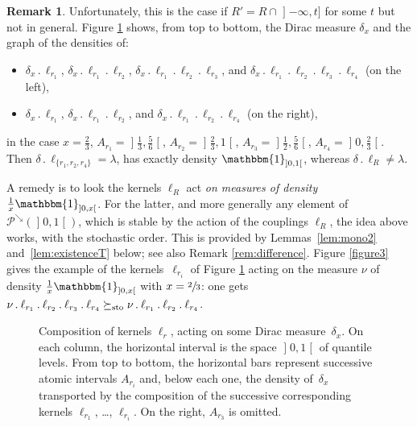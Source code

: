 \documentclass[JEP,XML,SOM,Unicode,NoEqCountersInSection,NoFloatCountersInSection,published]{cedram}
\newcommand{\ldot}{\mathbin{.}}
\theoremstyle{plain}
\theoremstyle{definition}
\newtheorem{rem}[them]{Remark}
\newcommand{\one}{\mathbbm{1}}
\newcommand{\la}{\lambda}
\newcommand{\geqs}{\succeq_{\text{\rm sto}}}
\newcommand{\pdec}{\mathcal{P}^{\scriptscriptstyle\searrow}}
\newcommand{\op}{\mathopen}
\newcommand{\clo}{\mathclose}
\begin{document}
\begin{rem}
Unfortunately, this is the case if $R'=R\cap\op]-\infty,t]$ for some $t$ but not in general. Figure \ref{figure2} shows, from top to bottom, the Dirac measure $\delta_x$ and the graph of the densities of:
\begin{itemize}
\item
$\delta_x \ldot\ell_{r_1}$, $\delta_x \ldot\ell_{r_1}{}\ldot\ell_{r_2}$, $\delta_x \ldot\ell_{r_1}{}\ldot\ell_{r_2}{}\ldot\ell_{r_3}$, and $\delta_x \ldot\ell_{r_1}{}\ldot\ell_{r_2}{}\ldot\ell_{r_3}{}\ldot\ell_{r_4}$ (on the left),

\item
$\delta_x \ldot\ell_{r_1}$, $\delta_x \ldot\ell_{r_1}{}\ldot\ell_{r_2}$, and $\delta_x \ldot\ell_{r_1}{}\ldot\ell_{r_2}{}\ldot\ell_{r_4}$ (on the right),
\end{itemize}
in the case $x=\frac23$, $A_{r_1}=\op]\frac13,\frac56\clo[$, $A_{r_2}=\op]\frac23,1\clo[$, $A_{r_3}=\op]\frac12,\frac56\clo[$, $A_{r_4}=\op]0,\frac23\clo[$. Then $\delta\ldot\ell_{\{r_1,r_2,r_4\}}=\la$, \ie has exactly density $\one_{\op]0,1\clo[}$, whereas $\delta\ldot\ell_{R}\neq\la$.

A remedy is to look the kernels $\ell_R$ act \emph{on measures of density $\frac1x\one_{\op]0,x\clo[}$}. For the latter, and more generally any element of
$\pdec(\op]0,1\clo[)$, which is stable by the action of the couplings $\ell_R$, the idea above works, with the stochastic order. This is provided by Lemmas~\ref{lem:mono2} and~\ref{lem:existenceT} below; see also Remark \ref{rem:difference}. Figure \ref{figure3} gives the example of the kernels~$\ell_{r_i}$ of Figure \ref{figure2} acting on the measure $\nu$ of density $\frac1x\one_{\op]0,x\clo[}$ with $x=\sfrac23$: one gets \hbox{$\nu\ldot\ell_{r_1}{}\ldot\ell_{r_2}{}\ldot\ell_{r_3}{}\ldot\ell_{r_4}\geqs\nu\ldot\ell_{r_1}{}\ldot\ell_{r_2}{}\ldot\ell_{r_4}$}.
\end{rem}

\begin{figure}
\def\svgwidth{.7\textwidth}
\hspace*{\fill}\hspace*{\fill}\mbox{}\hspace*{\fill}
\caption{Composition of kernels $\ell_r$, acting on some Dirac measure~$\delta_x$. On each column, the horizontal interval is the space $\op]0,1\clo[$ of quantile levels. From top to bottom, the horizontal bars represent successive atomic intervals $A_{r_i}$ and, below each one, the density of~$\delta_x$ transported by the composition of the successive corresponding kernels $\ell_{r_1}$, \ldots, $\ell_{r_i}$. On the right, $A_{r_3}$ is omitted.}\label{figure2}
\end{figure}
\end{document}
